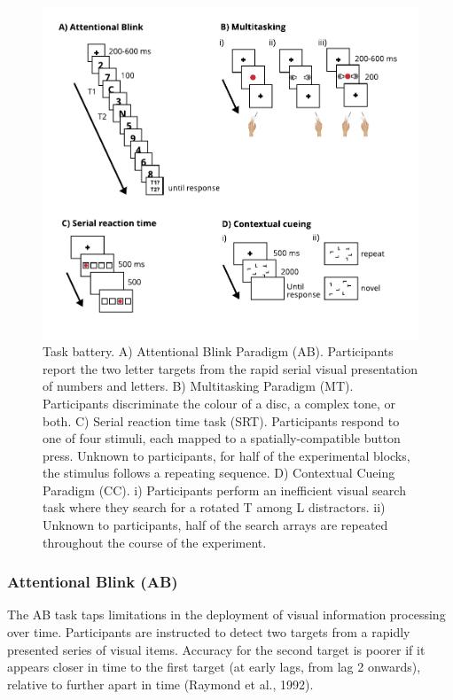 \documentclass[
  man]{apa6}
\begin{document}
\begin{figure}

{\centering \includegraphics[width=0.7\linewidth]{../../images/FigXXXX_alltasks} 

}

\caption{Task battery. A) Attentional Blink Paradigm (AB). Participants report the two letter targets from the rapid serial visual presentation of numbers and letters. B) Multitasking Paradigm (MT). Participants discriminate the colour of a disc, a complex tone, or both. C) Serial reaction time task (SRT). Participants respond to one of four stimuli, each mapped to a spatially-compatible button press. Unknown to participants, for half of the experimental blocks, the stimulus follows a repeating sequence. D) Contextual Cueing Paradigm (CC). i) Participants perform an inefficient visual search task where they search for a rotated T among L distractors. ii) Unknown to participants, half of the search arrays are repeated throughout the course of the experiment. }\label{fig:FigureParadigm}
\end{figure}

\hypertarget{attentional-blink-ab}{%
\subsubsection{Attentional Blink (AB)}\label{attentional-blink-ab}}

\label{sec:ABMeth}

The AB task taps limitations in the deployment of visual information processing over time. Participants are instructed to detect two targets from a rapidly presented series of visual items. Accuracy for the second target is poorer if it appears closer in time to the first target (at early lags, from lag 2 onwards), relative to further apart in time (Raymond et al., 1992).
\end{document}
